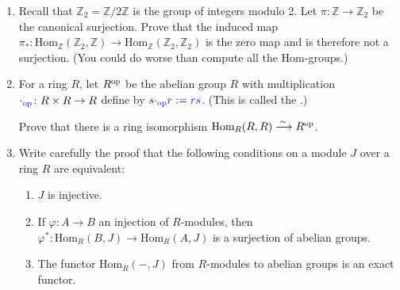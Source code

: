 \documentclass[12pt]{article}
\newcommand{\ZZ}{{\mathbb Z}}
\newcommand{\Hom}{\mbox{Hom}}
\def\demph#1{{\color{blue}{\sl #1}}}
\def\defcolor#1{{\color{blue}#1}}
\begin{document}
\begin{enumerate}

 \item  Recall that $\ZZ_2=\ZZ/2\ZZ$ is the group of integers modulo 2.
 Let $\pi\colon \ZZ\to\ZZ_2$ be the canonical surjection.
 Prove that the induced map $\pi_*\colon\Hom_\ZZ(\ZZ_2,\ZZ)\to\Hom_\ZZ(\ZZ_2,\ZZ_2)$ is the zero map and is therefore not a surjection.
 (You could do worse than compute all the $\Hom$-groups.)
 \vspace{-2pt}

\item   For a ring $R$, let \defcolor{$R^{\rm op}$}  be the abelian group $R$ with multiplication
  $\defcolor{\cdot_{\rm op}}\colon R\times R \to R$ define by $s\defcolor{\cdot_{\rm op}r:=rs}$.\newline
  (This is called the \demph{opposite ring to $R$}.)

  Prove that there is a ring isomorphism $\Hom_R(R,R)\xrightarrow{\,\sim\,} R^{\rm op}$.
 \vspace{-2pt} 


\item  Write carefully the proof that the following conditions on a module $J$ over a ring $R$ are equivalent:
  \begin{enumerate}
  \item $J$ is injective.
  \item If $\varphi\colon A\to B$ an injection of $R$-modules, then
    $\varphi^*\colon\Hom_R(B,J)\to\Hom_R(A,J)$ is a surjection of abelian groups.
  \item  The functor $\Hom_R(-,J)$ from $R$-modules to abelian groups is an exact functor.
  \end{enumerate}
   \vspace{-2pt}

\end{enumerate}
\end{document}
